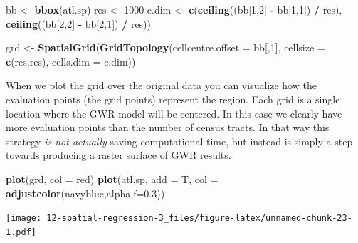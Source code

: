 \documentclass[
]{book}
\newenvironment{Shaded}{\begin{snugshade}}{\end{snugshade}}
\newcommand{\AttributeTok}[1]{\textcolor[rgb]{0.13,0.29,0.53}{#1}}
\newcommand{\DecValTok}[1]{\textcolor[rgb]{0.00,0.00,0.81}{#1}}
\newcommand{\FloatTok}[1]{\textcolor[rgb]{0.00,0.00,0.81}{#1}}
\newcommand{\FunctionTok}[1]{\textcolor[rgb]{0.13,0.29,0.53}{\textbf{#1}}}
\newcommand{\NormalTok}[1]{#1}
\newcommand{\OtherTok}[1]{\textcolor[rgb]{0.56,0.35,0.01}{#1}}
\newcommand{\SpecialCharTok}[1]{\textcolor[rgb]{0.81,0.36,0.00}{\textbf{#1}}}
\newcommand{\StringTok}[1]{\textcolor[rgb]{0.31,0.60,0.02}{#1}}
\begin{document}
\begin{Shaded}
\begin{Highlighting}[]
\NormalTok{bb }\OtherTok{\textless{}{-}} \FunctionTok{bbox}\NormalTok{(atl.sp)}
\NormalTok{res }\OtherTok{\textless{}{-}} \DecValTok{1000}
\NormalTok{c.dim }\OtherTok{\textless{}{-}} \FunctionTok{c}\NormalTok{(}\FunctionTok{ceiling}\NormalTok{((bb[}\DecValTok{1}\NormalTok{,}\DecValTok{2}\NormalTok{] }\SpecialCharTok{{-}}\NormalTok{ bb[}\DecValTok{1}\NormalTok{,}\DecValTok{1}\NormalTok{]) }\SpecialCharTok{/}\NormalTok{ res),}
           \FunctionTok{ceiling}\NormalTok{((bb[}\DecValTok{2}\NormalTok{,}\DecValTok{2}\NormalTok{] }\SpecialCharTok{{-}}\NormalTok{ bb[}\DecValTok{2}\NormalTok{,}\DecValTok{1}\NormalTok{]) }\SpecialCharTok{/}\NormalTok{ res))}

\NormalTok{grd }\OtherTok{\textless{}{-}} \FunctionTok{SpatialGrid}\NormalTok{(}\FunctionTok{GridTopology}\NormalTok{(}\AttributeTok{cellcentre.offset =}\NormalTok{ bb[,}\DecValTok{1}\NormalTok{], }
                                \AttributeTok{cellsize =} \FunctionTok{c}\NormalTok{(res,res), }
                                \AttributeTok{cells.dim =}\NormalTok{ c.dim))}
\end{Highlighting}
\end{Shaded}

When we plot the grid over the original data you can visualize how the evaluation points (the grid points) represent the region. Each grid is a single location where the GWR model will be centered. In this case we clearly have more evaluation points than the number of census tracts. In that way this strategy \emph{is not actually} saving computational time, but instead is simply a step towards producing a raster surface of GWR results.

\begin{Shaded}
\begin{Highlighting}[]
\FunctionTok{plot}\NormalTok{(grd, }\AttributeTok{col =} \StringTok{\textquotesingle{}red\textquotesingle{}}\NormalTok{)}
\FunctionTok{plot}\NormalTok{(atl.sp, }\AttributeTok{add =}\NormalTok{ T, }\AttributeTok{col =} \FunctionTok{adjustcolor}\NormalTok{(}\StringTok{\textquotesingle{}navyblue\textquotesingle{}}\NormalTok{,}\AttributeTok{alpha.f=}\FloatTok{0.3}\NormalTok{))}
\end{Highlighting}
\end{Shaded}

\texttt{[image: 12-spatial-regression-3\_files/figure-latex/unnamed-chunk-23-1.pdf]}
\end{document}
